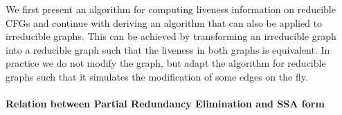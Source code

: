 We first present an algorithm for computing liveness information on
reducible CFGs and continue with deriving an algorithm that can also
be applied to irreducible graphs. This can be achieved by transforming
an irreducible graph into a reducible graph such that the liveness in
both graphs is equivalent. In practice we do not modify the graph, but
adapt the algorithm for reducible graphs such that it simulates the
modification of some edges on the fly.




\paragraph{Relation between Partial Redundancy Elimination and SSA form}

